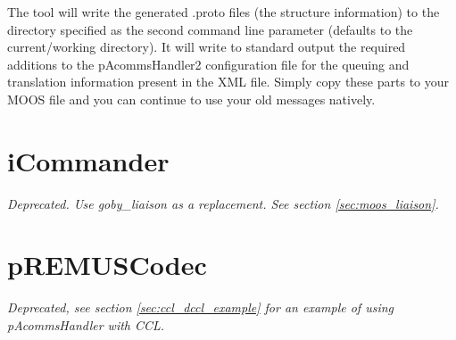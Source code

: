 The tool will write the generated .proto files (the structure information) to the directory specified as the second command line parameter (defaults to the current/working directory). It will write to standard output the required additions to the pAcommsHandler2 configuration file for the queuing and translation information present in the XML file. Simply copy these parts to your MOOS file and you can continue to use your old messages natively.


\section{iCommander}\label{sec:icommander} 

\textit{Deprecated. Use goby\_liaison as a replacement. See section \ref{sec:moos_liaison}.}

\section{pREMUSCodec}

\textit{Deprecated, see section \ref{sec:ccl_dccl_example} for an example of using pAcommsHandler with CCL.}

\DeleteShortVerb{\!}
